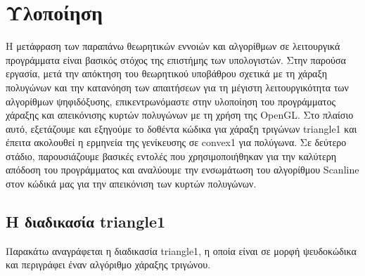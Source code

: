 \chapter{Υλοποίηση}
Η μετάφραση των παραπάνω θεωρητικών εννοιών και αλγορίθμων σε λειτουργικά προγράμματα είναι βασικός στόχος της επιστήμης των υπολογιστών. Στην παρούσα εργασία, μετά την απόκτηση του θεωρητικού υποβάθρου σχετικά με τη χάραξη πολυγώνων και την κατανόηση των απαιτήσεων για τη μέγιστη λειτουργικότητα των αλγορίθμων ψηφιδόξυσης, επικεντρωνόμαστε στην υλοποίηση του προγράμματος χάραξης και απεικόνισης κυρτών πολυγώνων με τη χρήση της \textlatin{OpenGL}. Στο πλαίσιο αυτό, εξετάζουμε και εξηγούμε το δοθέντα κώδικα για χάραξη τριγώνων \textlatin{triangle1} και έπειτα ακολουθεί η ερμηνεία της γενίκευσης σε \textlatin{convex1} για πολύγωνα. Σε δεύτερο στάδιο, παρουσιάζουμε βασικές εντολές που χρησιμοποιήθηκαν για την καλύτερη απόδοση του προγράμματος και αναλύουμε την ενσωμάτωση του αλγορίθμου \textlatin{Scanline} στον κώδικά μας για την απεικόνιση των κυρτών πολυγώνων. 

\section{Η διαδικασία \textlatin{triangle1}}
Παρακάτω αναγράφεται η διαδικασία \textlatin{triangle1}, η οποία είναι σε μορφή ψευδοκώδικα και περιγράφει έναν αλγόριθμο χάραξης τριγώνου.

